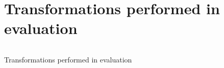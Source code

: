 \section{Transformations performed in evaluation}
\label{appendix:performed-transformations}

\begin{code}
\inputminted[linenos,tabsize=2,breaklines]{json}{code/applied-transformations.json}
\caption{Transformations performed in evaluation}
\label{listing:performed-transformations}
\end{code}

